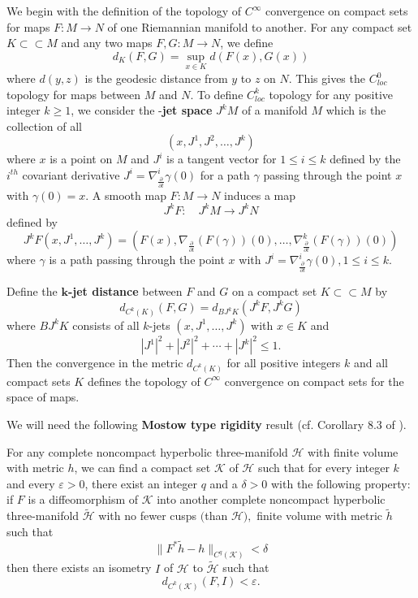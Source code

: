 \smallskip
We begin with the definition of the topology of $C^\infty$
convergence on compact sets for maps $F:M\rightarrow N$ of one
Riemannian manifold to another. For any compact set
$K\subset\subset M$ and any two maps $F,G:M\rightarrow N$, we
define
$$
d_K(F,G)=\sup_{x\in K}d(F(x),G(x))
$$
where $d(y,z)$ is the geodesic distance from $y$ to $z$ on $N$.
This gives the $C^0_{loc}$ topology for maps between $M$ and $N$.
To define $C^k_{loc}$ topology for any positive integer $k\ge1$,
we consider the \mbox{}-{\bf jet
space} $J^kM$ of a manifold $M$ which is the
collection of all
$$
(x,J^1,J^2,\ldots,J^k)
$$
where $x$ is a point on $M$ and $J^i$ is a tangent vector for
$1\le i\le k$ defined by the $i^{th}$ covariant derivative
$J^i=\nabla^i_\frac{\partial}{\partial t}\gamma(0)$ for a path
$\gamma$ passing through the point $x$ with $\gamma(0)=x$. A
smooth map $F:M\rightarrow N$ induces a map $$J^kF:\quad
J^kM\rightarrow J^kN$$ defined by
$$
J^kF(x,J^1,\ldots,J^k)=(F(x),\nabla_\frac{\partial}{\partial t}
(F(\gamma))(0),\ldots, \nabla^k_\frac{\partial}{\partial
t}(F(\gamma))(0))
$$
where $\gamma$ is a path passing through the point $x$ with
$J^i=\nabla^i_\frac{\partial}{\partial t}\gamma(0),1\le i\le k.$

Define the {\bf ${\mathbf k}$-jet
distance} between $F$ and $G$ on a compact
set $K\subset\subset M$ by
$$
d_{C^k(K)}(F,G)=d_{BJ^kK}(J^kF,J^kG)
$$
where $BJ^kK$ consists of all $k$-jets $(x,J^1,\ldots,J^k)$ with
$x\in K$ and
$$
|J^1|^2+|J^2|^2+\cdots+|J^k|^2\le 1.
$$
Then the convergence in the metric $d_{C^k(K)}$ for all positive
integers $k$  and all compact sets $K$ defines the topology of
$C^\infty$ convergence on compact sets for the space of maps.

We will need the following \textbf{Mostow type rigidity}
 result (cf. Corollary 8.3 of
\cite{Ha99}).

\begin{lemma}
  \label{lem:cz-finite-volume-hyperbolic-embedding-stability}
 For any complete noncompact
hyperbolic three-manifold $\mathcal{H}$ with finite volume with
metric $h$, we can find a compact set $\mathcal{K}$ of
$\mathcal{H}$ such that for every integer $k$ and every
$\varepsilon>0$, there exist an integer $q$ and a $\delta>0$ with
the following property: if $F$ is a diffeomorphism of
$\mathcal{K}$ into another complete noncompact hyperbolic
three-manifold $\tilde{\mathcal{H}}$ with no fewer cusps $($than
$\mathcal{H}),$ finite volume with metric $\tilde{h}$ such that
$$
\|F^*\tilde{h}-h\|_{C^q(\mathcal{K})}<\delta
$$
then there exists an isometry $I$ of $\mathcal{H}$ to
$\tilde{\mathcal{H}}$ such that
$$
d_{C^k(\mathcal{K})}(F,I)<\varepsilon.
$$
\end{lemma}

